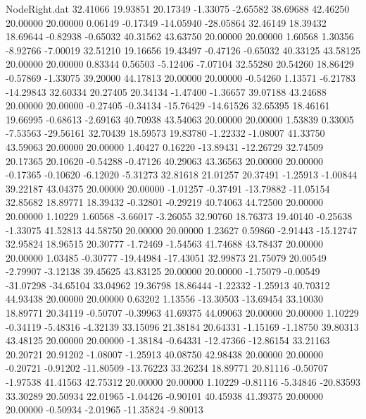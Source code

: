 \begin{filecontents}{NodeRight.dat}
  32.41066   19.93851   20.17349    -1.33075   -2.65582   38.69688   42.46250   20.00000   20.00000    0.06149   -0.17349  -14.05940  -28.05864
  32.46149   18.39432   18.69644    -0.82938   -0.65032   40.31562   43.63750   20.00000   20.00000    1.60568    1.30356   -8.92766   -7.00019
  32.51210   19.16656   19.43497    -0.47126   -0.65032   40.33125   43.58125   20.00000   20.00000    0.83344    0.56503   -5.12406   -7.07104
  32.55280   20.54260   18.86429    -0.57869   -1.33075   39.20000   44.17813   20.00000   20.00000   -0.54260    1.13571   -6.21783  -14.29843
  32.60334   20.27405   20.34134    -1.47400   -1.36657   39.07188   43.24688   20.00000   20.00000   -0.27405   -0.34134  -15.76429  -14.61526
  32.65395   18.46161   19.66995    -0.68613   -2.69163   40.70938   43.54063   20.00000   20.00000    1.53839    0.33005   -7.53563  -29.56161
  32.70439   18.59573   19.83780    -1.22332   -1.08007   41.33750   43.59063   20.00000   20.00000    1.40427    0.16220  -13.89431  -12.26729
  32.74509   20.17365   20.10620    -0.54288   -0.47126   40.29063   43.36563   20.00000   20.00000   -0.17365   -0.10620   -6.12020   -5.31273
  32.81618   21.01257   20.37491    -1.25913   -1.00844   39.22187   43.04375   20.00000   20.00000   -1.01257   -0.37491  -13.79882  -11.05154
  32.85682   18.89771   18.39432    -0.32801   -0.29219   40.74063   44.72500   20.00000   20.00000    1.10229    1.60568   -3.66017   -3.26055
  32.90760   18.76373   19.40140    -0.25638   -1.33075   41.52813   44.58750   20.00000   20.00000    1.23627    0.59860   -2.91443  -15.12747
  32.95824   18.96515   20.30777    -1.72469   -1.54563   41.74688   43.78437   20.00000   20.00000    1.03485   -0.30777  -19.44984  -17.43051
  32.99873   21.75079   20.00549    -2.79907   -3.12138   39.45625   43.83125   20.00000   20.00000   -1.75079   -0.00549  -31.07298  -34.65104
  33.04962   19.36798   18.86444    -1.22332   -1.25913   40.70312   44.93438   20.00000   20.00000    0.63202    1.13556  -13.30503  -13.69454
  33.10030   18.89771   20.34119    -0.50707   -0.39963   41.69375   44.09063   20.00000   20.00000    1.10229   -0.34119   -5.48316   -4.32139
  33.15096   21.38184   20.64331    -1.15169   -1.18750   39.80313   43.48125   20.00000   20.00000   -1.38184   -0.64331  -12.47366  -12.86154
  33.21163   20.20721   20.91202    -1.08007   -1.25913   40.08750   42.98438   20.00000   20.00000   -0.20721   -0.91202  -11.80509  -13.76223
  33.26234   18.89771   20.81116    -0.50707   -1.97538   41.41563   42.75312   20.00000   20.00000    1.10229   -0.81116   -5.34846  -20.83593
  33.30289   20.50934   22.01965    -1.04426   -0.90101   40.45938   41.39375   20.00000   20.00000   -0.50934   -2.01965  -11.35824   -9.80013

\end{filecontents}
